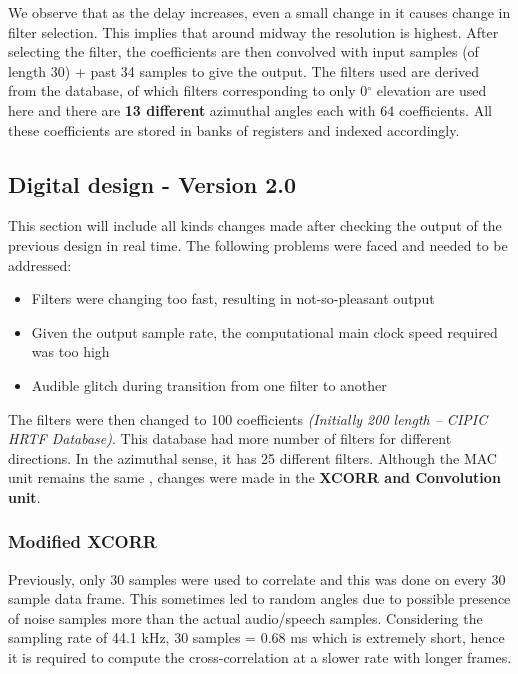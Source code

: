 \documentclass[BTech]{nitkdiss}
\begin{document}
We observe that as the delay increases, even a small change in it causes change in filter selection. This implies that around midway the resolution is highest. After selecting the filter, the coefficients are then convolved with input samples (of length 30) + past 34 samples to give  the output. \newline The filters used are derived from the database, of which filters corresponding to only 0$^{\circ}$ elevation are used here and there are \textbf{13 different} azimuthal angles each with 64 coefficients. All these coefficients are stored in banks of registers and indexed accordingly. 

\subsection{Digital design  - Version 2.0} \label{version2}

This section will include all kinds changes made after checking the output of the previous design in real time. The following problems were faced and needed to be addressed: \begin{itemize}
    \item Filters were changing too fast, resulting in not-so-pleasant output
    \item Given the output sample rate, the computational main clock speed required was too high
    \item Audible glitch during transition from one filter to another 
\end{itemize}

The filters were then changed to 100 coefficients \textit{(Initially 200 length -- CIPIC HRTF Database)}. This database had more number of filters for different directions. In the azimuthal sense, it has 25 different filters. Although the MAC unit remains the same , changes were made in the \textbf{XCORR and Convolution unit}.

\subsubsection{Modified XCORR}

Previously, only 30 samples were used to correlate and this was done on every 30 sample data frame. This sometimes led to random angles due to possible presence of noise samples more than the actual audio/speech samples. Considering the sampling rate of 44.1 kHz, 30 samples = 0.68 ms which is extremely short, hence it is required to compute the cross-correlation at a slower rate with longer frames. 
\end{document}

